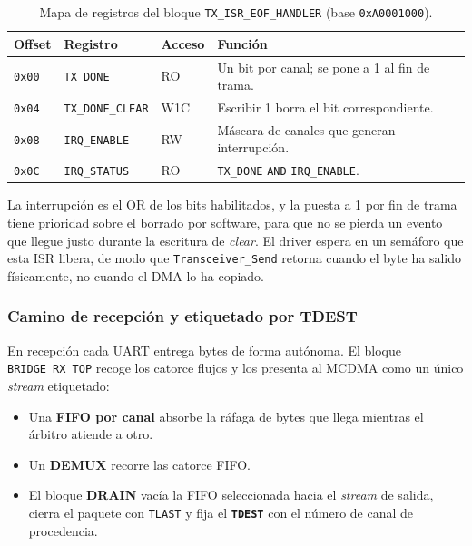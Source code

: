 \begin{table}[H]
    \centering
    \begin{tabular}{llll}
        \hline
        \textbf{Offset} & \textbf{Registro} & \textbf{Acceso} & \textbf{Función} \\
        \hline
        \texttt{0x00} & \texttt{TX\_DONE}       & RO  & Un bit por canal; se pone a 1 al fin de trama. \\
        \texttt{0x04} & \texttt{TX\_DONE\_CLEAR} & W1C & Escribir 1 borra el bit correspondiente. \\
        \texttt{0x08} & \texttt{IRQ\_ENABLE}    & RW  & Máscara de canales que generan interrupción. \\
        \texttt{0x0C} & \texttt{IRQ\_STATUS}    & RO  & \texttt{TX\_DONE} \texttt{AND} \texttt{IRQ\_ENABLE}. \\
        \hline
    \end{tabular}
    \caption{Mapa de registros del bloque \texttt{TX\_ISR\_EOF\_HANDLER} (base \texttt{0xA0001000}).}
    \label{tab:tx_isr_regs}
\end{table}

La interrupción es el OR de los bits habilitados, y la puesta a 1 por fin de trama tiene
prioridad sobre el borrado por software, para que no se pierda un evento que llegue justo
durante la escritura de \textit{clear}. El driver espera en un semáforo que esta ISR libera, de
modo que \texttt{Transceiver\_Send} retorna cuando el byte ha salido físicamente, no cuando el
DMA lo ha copiado.

\subsubsection{Camino de recepción y etiquetado por TDEST}

En recepción cada UART entrega bytes de forma autónoma. El bloque \texttt{BRIDGE\_RX\_TOP}
recoge los catorce flujos y los presenta al MCDMA como un único \textit{stream} etiquetado:

\begin{itemize}
    \item Una \textbf{FIFO por canal} absorbe la ráfaga de bytes que llega mientras el árbitro
    atiende a otro.
    \item Un \textbf{DEMUX} recorre las catorce FIFO.
    \item El bloque \textbf{DRAIN} vacía la FIFO seleccionada hacia el \textit{stream} de salida,
    cierra el paquete con \texttt{TLAST} y fija el \textbf{\texttt{TDEST}} con el número de canal de
    procedencia.
\end{itemize}

